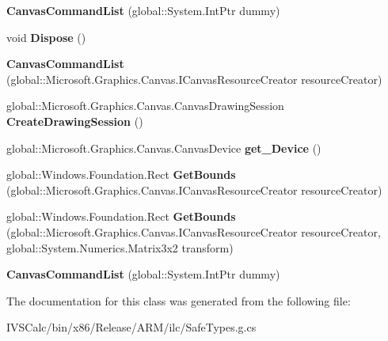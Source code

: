 \begin{DoxyCompactItemize}
\item 
\mbox{\label{class_microsoft_1_1_graphics_1_1_canvas_1_1_canvas_command_list_a56cf20ae9e747de3e640a93300982f4f}} 
{\bfseries Canvas\+Command\+List} (global\+::\+System.\+Int\+Ptr dummy)
\item 
\mbox{\label{class_microsoft_1_1_graphics_1_1_canvas_1_1_canvas_command_list_a26eecdc2e1e50ca004cd6ffbf3197786}} 
void {\bfseries Dispose} ()
\item 
\mbox{\label{class_microsoft_1_1_graphics_1_1_canvas_1_1_canvas_command_list_aa46aea923e0f8ed09d7c228ee0994a3d}} 
{\bfseries Canvas\+Command\+List} (global\+::\+Microsoft.\+Graphics.\+Canvas.\+I\+Canvas\+Resource\+Creator resource\+Creator)
\item 
\mbox{\label{class_microsoft_1_1_graphics_1_1_canvas_1_1_canvas_command_list_a4e6b387525b4db49e0c679aec814bc6d}} 
global\+::\+Microsoft.\+Graphics.\+Canvas.\+Canvas\+Drawing\+Session {\bfseries Create\+Drawing\+Session} ()
\item 
\mbox{\label{class_microsoft_1_1_graphics_1_1_canvas_1_1_canvas_command_list_afa1a1ee6bf0b44a69cd7ec45df0b6d49}} 
global\+::\+Microsoft.\+Graphics.\+Canvas.\+Canvas\+Device {\bfseries get\+\_\+\+Device} ()
\item 
\mbox{\label{class_microsoft_1_1_graphics_1_1_canvas_1_1_canvas_command_list_aca6d1c6135ba1dfb533e1ea91fc93a51}} 
global\+::\+Windows.\+Foundation.\+Rect {\bfseries Get\+Bounds} (global\+::\+Microsoft.\+Graphics.\+Canvas.\+I\+Canvas\+Resource\+Creator resource\+Creator)
\item 
\mbox{\label{class_microsoft_1_1_graphics_1_1_canvas_1_1_canvas_command_list_af2772a00b0012fc90598d8cf5789f357}} 
global\+::\+Windows.\+Foundation.\+Rect {\bfseries Get\+Bounds} (global\+::\+Microsoft.\+Graphics.\+Canvas.\+I\+Canvas\+Resource\+Creator resource\+Creator, global\+::\+System.\+Numerics.\+Matrix3x2 transform)
\item 
\mbox{\label{class_microsoft_1_1_graphics_1_1_canvas_1_1_canvas_command_list_a56cf20ae9e747de3e640a93300982f4f}} 
{\bfseries Canvas\+Command\+List} (global\+::\+System.\+Int\+Ptr dummy)
\end{DoxyCompactItemize}


The documentation for this class was generated from the following file\+:\begin{DoxyCompactItemize}
\item 
I\+V\+S\+Calc/bin/x86/\+Release/\+A\+R\+M/ilc/Safe\+Types.\+g.\+cs\end{DoxyCompactItemize}
